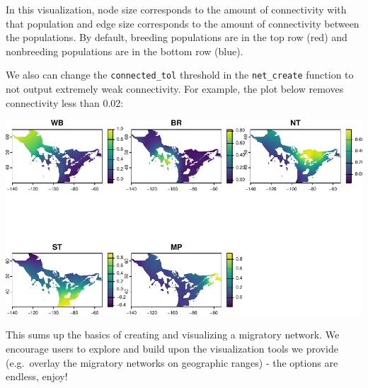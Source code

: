\documentclass[
]{book}
\newenvironment{Shaded}{\begin{snugshade}}{\end{snugshade}}
\newcommand{\AttributeTok}[1]{\textcolor[rgb]{0.13,0.29,0.53}{#1}}
\newcommand{\CommentTok}[1]{\textcolor[rgb]{0.56,0.35,0.01}{\textit{#1}}}
\newcommand{\DecValTok}[1]{\textcolor[rgb]{0.00,0.00,0.81}{#1}}
\newcommand{\FloatTok}[1]{\textcolor[rgb]{0.00,0.00,0.81}{#1}}
\newcommand{\FunctionTok}[1]{\textcolor[rgb]{0.13,0.29,0.53}{\textbf{#1}}}
\newcommand{\NormalTok}[1]{#1}
\newcommand{\OtherTok}[1]{\textcolor[rgb]{0.56,0.35,0.01}{#1}}
\newcommand{\SpecialCharTok}[1]{\textcolor[rgb]{0.81,0.36,0.00}{\textbf{#1}}}
\begin{document}
In this visualization, node size corresponds to the amount of connectivity with that population and edge size corresponds to the amount of connectivity between the populations. By default, breeding populations are in the top row (red) and nonbreeding populations are in the bottom row (blue).

We also can change the \texttt{connected\_tol} threshold in the \texttt{net\_create} function to not output extremely weak connectivity. For example, the plot below removes connectivity less than 0.02:

\begin{Shaded}
\end{Shaded}

\includegraphics{Mignette_files/figure-latex/unnamed-chunk-25-1.pdf}

This sums up the basics of creating and visualizing a migratory network. We encourage users to explore and build upon the visualization tools we provide (e.g.~overlay the migratory networks on geographic ranges) - the options are endless, enjoy!
\end{document}
